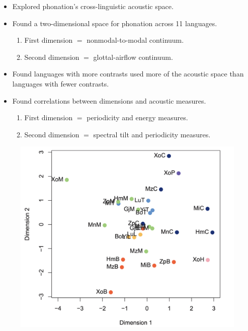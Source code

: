 \documentclass[professionalfont]{beamer}
\begin{document}
\begin{frame}{\citet{keatingCrosslanguageAcousticSpace2023}}
  \begin{itemize}
    \item Explored phonation's cross-linguistic acoustic space.
    \item Found a two-dimensional space for phonation across 11 languages.
    \begin{enumerate}
      \item First dimension $=$ nonmodal-to-modal continuum.
      \item Second dimension $=$ glottal-airflow continuum.
    \end{enumerate}
    \item Found languages with more contrasts used more of the acoustic space than languages with fewer contrasts.
    \item Found correlations between dimensions and acoustic measures.
    \begin{enumerate}
      \item First dimension $=$ periodicity and energy measures.
      \item Second dimension $=$ spectral tilt and periodicity measures.
    \end{enumerate}
  \end{itemize}
\end{frame}

\begin{frame}{\citet{keatingCrosslanguageAcousticSpace2023}}
  \begin{figure}[h!]
    \centering
    \includegraphics[width = 0.8\linewidth]{images/Keating_dimension.png}
  \end{figure}
\end{frame}
\end{document}
